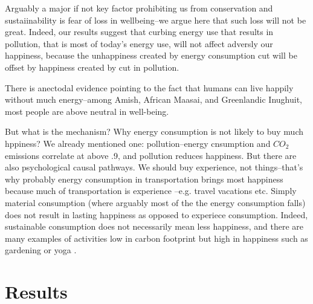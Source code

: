 \documentclass[10pt, letterpaper]{article}
\begin{document}
\begin{spacing}{1.4}

Arguably a major if not key factor prohibiting us from conservation and
sustaiinability is fear of loss in wellbeing--we argue here that such loss will
not be great. Indeed, our results suggest that curbing energy use that results
in pollution, that is most of today's energy use, will not affect adversly our
happiness, because the unhappiness created by energy consumption cut will be
offset by happiness created by cut in pollution.  

There is anectodal evidence pointing to the fact that humans can live happily
without much energy--among Amish, African Maasai, and Greenlandic Inughuit, most
people are above neutral in well-being.

But what is the mechanism? Why energy consumption is not likely to buy much
hppiness? We already mentioned one: pollution--energy cnsumption and $CO_2$
emissions correlate at above .9, and pollution reduces happiness. But there are
also psychological causal pathways.
We should buy experience, not things--that's why probably energy
consumption in transportation brings most happiness because much of
transportation is experience --e.g. travel vacations etc. 
Simply material consumption (where
arguably most of the  the energy consumption falls) does not result in lasting
happiness as opposed to experiece consumption. Indeed, sustainable consumption
does not necessarily mean less happiness, and there are many examples of
activities low in carbon footprint but high in happiness such as gardening or
yoga \citep{madjar06}. 


\section{Results}





\end{spacing}
\end{document}
